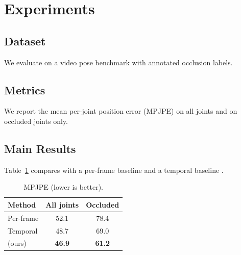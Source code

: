\section{Experiments}
\label{sec:experiments}

\subsection{Dataset}
We evaluate on a video pose benchmark with annotated occlusion labels.

\subsection{Metrics}
We report the mean per-joint position error (MPJPE) on all joints and on
occluded joints only.

\subsection{Main Results}
Table~\ref{tab:main} compares \method{} with a per-frame baseline and a
temporal baseline \citep{pavllo2019videopose}.

\begin{table}[t]
  \centering
  \begin{tabular}{lcc}
    \toprule
    Method & All joints & Occluded \\
    \midrule
    Per-frame & 52.1 & 78.4 \\
    Temporal & 48.7 & 69.0 \\
    \method{} (ours) & \textbf{46.9} & \textbf{61.2} \\
    \bottomrule
  \end{tabular}
  \caption{MPJPE (lower is better).}
  \label{tab:main}
\end{table}
